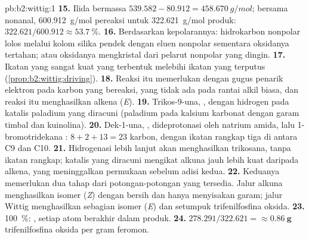 \begin{solution}{pb:b2:wittig:1}
\textbf{15.} Ilida  bermassa $539.582 - 80.912 = \qty{458.670}{g/mol}$; bersama nonanal,
\qty{600.912}{g/mol} pereaksi untuk \qty{322.621}{g/mol} produk: $322.621/600.912 \approx
53.7~\%$.
\textbf{16.} Berdasarkan kepolarannya: hidrokarbon nonpolar lolos melalui
kolom silika pendek dengan eluen nonpolar sementara oksidanya tertahan;
atau oksidanya mengkristal dari pelarut nonpolar yang dingin.
\textbf{17.} Ikatan  yang sangat kuat yang terbentuk melebihi ikatan
 yang terputus (\cref{prop:b2:wittig:driving}).
\textbf{18.} Reaksi itu memerlukan  dengan gugus penarik elektron
pada karbon yang bereaksi, yang tidak ada pada rantai alkil biasa, dan
reaksi itu menghasilkan alkena (\textit{E}).
\textbf{19.} Trikos-9-una, , dengan hidrogen pada
katalis paladium yang diracuni (paladium pada kalsium karbonat dengan garam
timbal dan kuinolina).
\textbf{20.} Dek-1-una, , dideprotonasi oleh natrium amida,
lalu 1-bromotridekana
: $8 + 2 + 13 = 23$ karbon, dengan ikatan rangkap tiga di antara C9 dan C10.
\textbf{21.} Hidrogenasi lebih lanjut akan menghasilkan trikosana, tanpa
ikatan rangkap; katalis yang diracuni mengikat alkuna jauh lebih kuat
daripada alkena, yang meninggalkan permukaan sebelum adisi kedua.
\textbf{22.} Keduanya memerlukan dua tahap dari potongan-potongan yang
tersedia. Jalur alkuna menghasilkan isomer (\textit{Z}) dengan bersih dan
hanya menyisakan garam; jalur Wittig menghasilkan sebagian isomer
(\textit{E}) dan setumpuk trifenilfosfina oksida.
\textbf{23.} 100~\%: , setiap atom berakhir dalam produk.
\textbf{24.} $278.291/322.621 = \boldsymbol{\approx \qty{0.86}{g}}$
trifenilfosfina oksida per gram feromon.
\end{solution}
